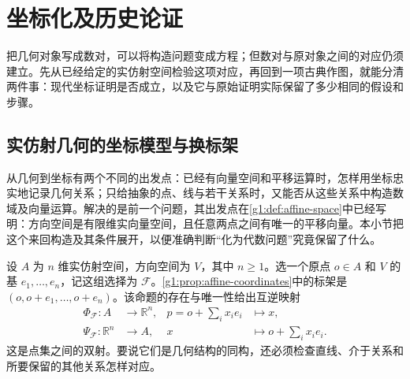 \section{坐标化及历史论证}
\label{g1:sec:A02}

把几何对象写成数对，可以将构造问题变成方程；但数对与原对象之间的对应仍须建立。先从已经给定的实仿射空间检验这项对应，再回到一项古典作图，就能分清两件事：现代坐标证明是否成立，以及它与原始证明实际保留了多少相同的假设和步骤。

\subsection{实仿射几何的坐标模型与换标架}
\label{g1:subsec:A02:01}

从几何到坐标有两个不同的出发点：已经有向量空间和平移运算时，怎样用坐标忠实地记录几何关系；只给抽象的点、线与若干关系时，又能否从这些关系中构造数域及向量运算。解决的是前一个问题，其出发点在\cref{g1:def:affine-space}中已经写明：方向空间是有限维实向量空间，且任意两点之间有唯一的平移向量。本小节把这个来回构造及其条件展开，以便准确判断“化为代数问题”究竟保留了什么。

\ProseParagraphBreak

设 \(A\) 为 \(n\) 维实仿射空间，方向空间为 \(V\)，其中 \(n\ge1\)。选一个原点 \(o\in A\) 和 \(V\) 的基 \(e_1,\ldots,e_n\)，记这组选择为 \(\mathcal F\)。\cref{g1:prop:affine-coordinates}中的标架是 \((o,o+e_1,\ldots,o+e_n)\)。该命题的存在与唯一性给出互逆映射
\[
	\begin{aligned}
		\Phi_{\mathcal F}:A&\longrightarrow\mathbb R^n,
		& p=o+\sum_i x_ie_i&\longmapsto x,\\
		\Psi_{\mathcal F}:\mathbb R^n&\longrightarrow A,
		& x&\longmapsto o+\sum_i x_ie_i.
	\end{aligned}
\]
这是点集之间的双射。要说它们是几何结构的同构，还必须检查直线、介于关系和所要保留的其他关系怎样对应。


